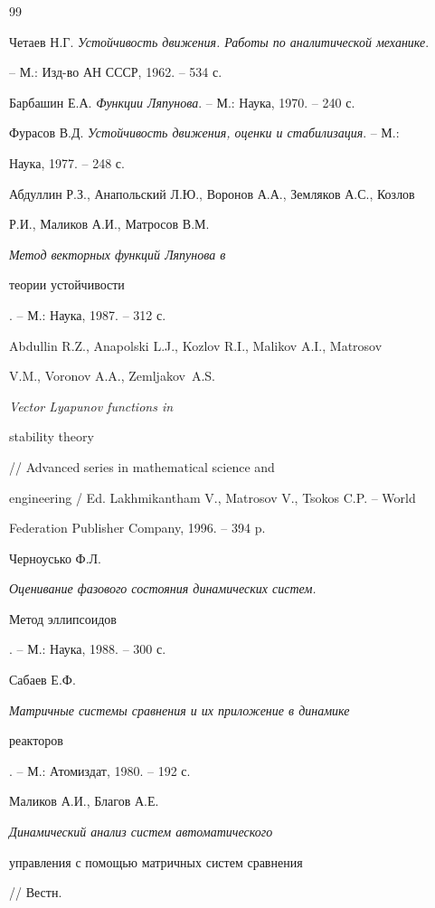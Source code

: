 \begin{thebibliography}{99} 


 




Четаев Н.Г. {\em Устойчивость движения. Работы по аналитической механике}. 


-- М.: Изд-во АН СССР, 1962. -- 534 с. 




Барбашин Е.А. {\em Функции Ляпунова}. -- М.: Наука, 1970. -- 240 с. 




Фурасов В.Д. {\em Устойчивость движения, оценки и стабилизация}. -- М.: 


Наука, 1977. -- 248 с. 




Абдуллин Р.З., Анапольский Л.Ю., Воронов А.А., Земляков А.С., Козлов 


Р.И., Маликов А.И., Матросов В.М. {\em Метод векторных функций Ляпунова в 


теории устойчивости}. -- М.: Наука, 1987. -- 312 с. 




Abdullin R.Z., Anapolski L.J., Kozlov R.I., Malikov A.I., Matrosov 


V.M., Voronov A.A., Zem\-lja\-kov~A.S. {\em Vector Lyapunov functions in 


stability theory} // Advanced series in mathematical science and 


engineering / Ed. Lakhmikantham V., Matrosov V., Tsokos C.P. -- World 


Federation Publisher Company, 1996. -- 394 p. 




Черноусько Ф.Л. {\em Оценивание фазового состояния динамических систем. 


Метод эллипсоидов}. -- М.: Наука, 1988. -- 300 с. 




Сабаев Е.Ф. {\em Матричные системы сравнения и их приложение в динамике 


реакторов}. -- М.: Атомиздат, 1980. -- 192 с. 




Маликов А.И., Благов А.Е. {\em Динамический анализ систем автоматического 


управления с помощью матричных систем сравнения} // Вестн. 



\end{thebibliography}
